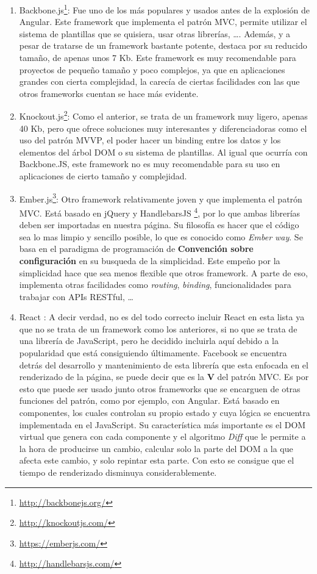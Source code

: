 \begin{enumerate}
  \item Backbone.js\footnote{\url{http://backbonejs.org/}}: Fue uno de los más populares y usados antes de la explosión de Angular. Este framework que implementa el patrón \gls{MVC}, permite utilizar el sistema de plantillas que se quisiera, usar otras librerías, \ldots. Además, y a pesar de tratarse de un framework bastante potente, destaca por su reducido tamaño, de apenas unos 7 Kb. Este framework es muy recomendable para proyectos de pequeño tamaño y poco complejos, ya que en aplicaciones grandes con cierta complejidad, la carecía de ciertas facilidades con las que otros frameworks cuentan se hace más evidente.
  \item Knockout.js\footnote{\url{http://knockoutjs.com/}}: Como el anterior, se trata de un framework muy ligero, apenas 40 Kb, pero que ofrece soluciones muy interesantes y diferenciadoras como el uso del patrón \gls{MVVP}, el poder hacer un binding entre los datos y los elementos del árbol \gls{DOM} o su sistema de plantillas. Al igual que ocurría con Backbone.JS, este framework no es muy recomendable para su uso en aplicaciones de cierto tamaño y complejidad.
  \item Ember.js\footnote{\url{https://emberjs.com/}}: Otro framework relativamente joven y que implementa el patrón \gls{MVC}. Está basado en jQuery y HandlebarsJS \footnote{\url{http://handlebarsjs.com/}}, por lo que ambas librerías deben ser importadas en nuestra página. Su filosofía es hacer que el código sea lo mas limpio y sencillo posible, lo que es conocido como \emph{Ember way}. Se basa en el paradigma de programación de \textbf{Convención sobre configuración} en su busqueda de la simplicidad. Este empeño por la simplicidad hace que sea menos flexible que otros framework. A parte de eso, implementa otras facilidades como \emph{routing}, \emph{binding}, funcionalidades para trabajar con APIs RESTful, \ldots
  \item React \cite{ReactJSEMACSScript}: A decir verdad, no es del todo correcto incluir React en esta lista ya que no se trata de un framework como los anteriores, si no que se trata de una librería de JavaScript, pero he decidido incluirla aquí debido a la popularidad que está consiguiendo últimamente. Facebook se encuentra detrás del desarrollo y mantenimiento de esta librería que esta enfocada en el renderizado de la página, se puede decir que es la \textbf{V} del patrón \gls{MVC}. Es por esto que puede ser usado junto otros frameworks que se encarguen de otras funciones del patrón, como por ejemplo, con Angular. Está basado en componentes, los cuales controlan su propio estado y cuya lógica se encuentra implementada en el JavaScript. Su característica más importante es el DOM virtual que genera con cada componente y el algoritmo \emph{Diff} que le permite a la hora de producirse un cambio, calcular solo la parte del DOM a la que afecta este cambio, y solo repintar esta parte. Con esto se consigue que el tiempo de renderizado disminuya considerablemente.
\end{enumerate}

